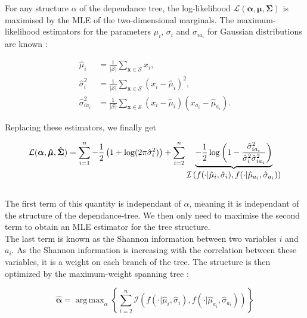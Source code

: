 \documentclass[a4paper,10pt]{article}
\DeclareMathOperator*{\argmax}{arg\,max}
\begin{document}
For any structure $\alpha$ of the dependance tree, the log-likelihood $\mathcal{L}(\bm{\alpha},\bm{\mu},\bm{\Sigma})$
is maximised by the MLE of the two-dimensional marginals. The maximum-likelihood estimators for the parameters 
$\mu_i$, $\sigma_i$ and $\sigma_{ia_i}$ for Gaussian distributions are known :

\begin{align*} 
\hat{\mu}_i &= \frac{1}{|\mathcal{S}|}\sum_{\bm{x} \in \mathcal{S}} x_i, \\
\hat{\sigma}_i^2 &= \frac{1}{|\mathcal{S}|}\sum_{\bm{x} \in \mathcal{S}} (x_i - \hat{\mu}_i)^2,\\
\hat{\sigma}_{ia_i}^2 &= \frac{1}{|\mathcal{S}|}\sum_{\bm{x} \in \mathcal{S}} (x_i - \hat{\mu}_i) (x_{a_i} - \hat{\mu}_{a_i}).
\end{align*}

Replacing these estimators, we finally get

\[ \mathcal{L}(\bm{\alpha},\bm{\hat{\mu}},\bm{\hat{\Sigma}}) = \sum\limits_{i=1}^n -\frac{1}{2} \left(1+\log(2\pi\hat{\sigma}_i^2)\right) + 
\sum\limits_{i=2}^n \underbrace{- \frac{1}{2} \log \left( 1- \frac{\hat{\sigma}_{ia_i}^2}{\hat{\sigma}_i^2 \hat{\sigma}_{ia_i}^2}\right)}_{\text{\normalsize{$\mathcal{I}\left(f
(\cdot|\hat{\mu}_i,\hat{\sigma}_i),f(\cdot|\hat{\mu}_{a_i},\hat{\sigma}_{a_i})\right)$}}}\]\\

The first term of this quantity is independant of $\alpha$, meaning it is independant of the structure of the dependance-tree. We then only need to maximise
the second term to obtain an MLE estimator for the tree structure.\\

The last term is known as the Shannon information between two variables $i$ and $a_i$. As the Shannon information is increasing with 
the correlation between these variables, it is a weight on each branch of the tree. The structure is then optimized by the maximum-weight spanning tree :

\[ \hat{\bm{\alpha}} = \argmax_\alpha \left\{ \sum\limits_{i=2}^n \mathcal{I}\left(f(\cdot|\hat{\mu}_i,\hat{\sigma}_i),
f(\cdot|\hat{\mu}_{a_i},\hat{\sigma}_{a_i})\right) \right\} \]
\end{document}
